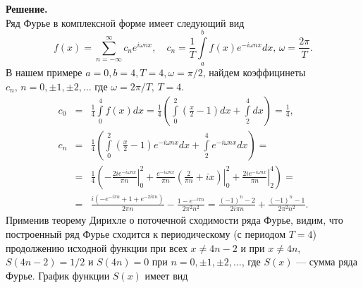 \noindent
\textbf{Решение.}\\

\noindent
Ряд Фурье в комплексной форме имеет следующий вид
\[
f(x) = \sum_{n=-\infty}^\infty c_n e^{i\omega nx},\quad c_n=\frac{1}{T}\int\limits_a^b f(x) e^{-i\omega nx}dx,\,\omega=\frac{2\pi}{T}.
\]
В нашем примере $ a=0,b=4,T=4,\omega=\pi/2$, 
найдем коэффицинеты $c_n,\,n=0,\pm1,\pm2,\ldots$
где $\omega=2\pi/T,\,T=4.$
$$
\begin{array}{rcl}
c_0 &=&\displaystyle\frac{1}{4} \int\limits_0^4 f(x)dx=\frac{1}{4}\left( \int\limits_0^2 (\frac{x}{2}-1)dx + \int\limits_2^4 dx \right)=\frac{1}{4},\\[12pt]
c_n &=&\displaystyle\frac{1}{4}\left(
\int\limits_0^2
(\frac{x}{2}-1)e^{-i\omega nx}dx + \int\limits_2^4
e^{-i\omega nx}dx \right) ={}\\[12pt]
&=&\displaystyle\frac{1}{4}\left(
-\left.\frac{2ie^{-i\omega nx}}{\pi n}\right|_0^2
+\left.\frac{e^{-i\omega nx}}{\pi n}\left(\frac{2}{\pi n} + {ix}\right)\right|_0^2 + \left.\frac{2ie^{-i\omega nx}}{\pi n}\right|_2^4\right) = \\[12pt]
&=&\displaystyle\frac{i(-e^{-i\pi n}+1+e^{-2i\pi n})}{2\pi n}-\frac{1-e^{-i\pi n}}{2\pi^2 n^2}=\frac{(-1)^n-2}{2 i\pi n}+\frac{(-1)^n-1}{2\pi^2 n^2}.
\end{array}
$$
\noindent
Применив теорему Дирихле о поточечной сходимости ряда Фурье, видим, что построенный ряд Фурье сходится 
к периодическому (с периодом $T=4$) продолжению исходной функции при всех $x\ne 4n-2$ и при $x\ne 4n$, $S(4n-2)=1/2$ и $S(4n)=0$ при 
$n=0,\pm1,\pm2,\ldots$, где $S(x)$ --- сумма ряда Фурье. График функции $S(x)$ имеет вид
